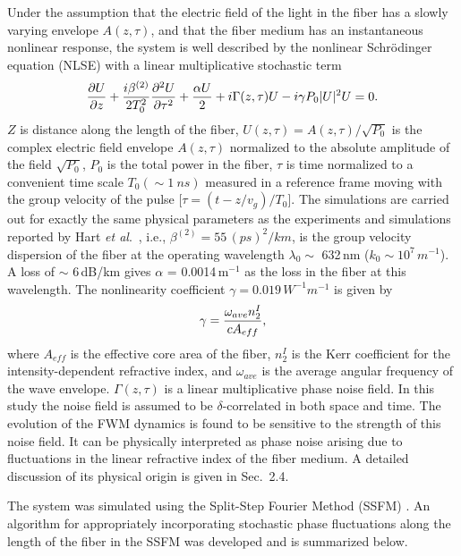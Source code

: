 Under the assumption that the electric field of the light in the fiber has a 
slowly varying envelope $A(z,\tau)$, and that the fiber medium has an 
instantaneous nonlinear response, the system is well described by the 
nonlinear Schr\"{o}dinger equation (NLSE) with a linear multiplicative
stochastic term
\begin{equation}
{\partial U \over \partial z} + {i\beta^{(2)} \over 2T_0^2} 
{\partial^2 U \over \partial\tau^2} + {\alpha U \over 2}
 + i\Gamma(z,\tau)U-i\gamma P_0 |U|^2 U = 0.
\end{equation}
$Z$ is distance along the length of the fiber, 
$U(z,\tau)=A(z,\tau)/\sqrt{P_0}$ is the complex electric field envelope 
$A(z,\tau)$ normalized to the absolute amplitude of the field $\sqrt{P_0}$, 
$P_0$ is the total power in the fiber, $\tau$ is time normalized to a 
convenient time scale $T_0(\sim 1\ ns)$ measured in a reference frame 
moving with the group velocity of the pulse [$\tau=(t-z/v_g)/T_0$]. The 
simulations are carried out for exactly the same physical parameters as the 
experiments and simulations reported by Hart {\it et al}.\ \cite{hart1}, i.e., 
$\beta^{(2)}=55\,(ps)^2/km$, is the group velocity dispersion of the fiber at 
the operating wavelength $\lambda_{0}\sim$ 632\,nm 
($k_0\sim 10^7\,m^{-1}$). A loss of $\sim$ 6\,dB/km gives $\alpha$ = 0.0014\,m$^{-1}$ as the 
loss in the fiber at this wavelength. The nonlinearity coefficient 
$\gamma=0.019\,W^{-1}m^{-1}$ is given by 
\begin{equation}
\gamma = {\omega_{ave}n_2^I \over cA_{eff}},
\end{equation}
where $A_{eff}$ is the effective core area of the fiber,
$n_2^I$ is the Kerr coefficient for the intensity-dependent refractive index, and 
$\omega_{ave}$ is the average angular frequency of the wave envelope. 
$\Gamma(z,\tau)$ is a linear multiplicative phase noise field. In this study 
the noise field is assumed to be $\delta$-correlated in both space and time. 
The evolution of the FWM dynamics is found to be sensitive to the strength of 
this noise field. It can be physically interpreted as phase noise arising due 
to fluctuations in the linear refractive index of the fiber medium. A detailed 
discussion of its physical origin is given in Sec.\ 2.4.

The system was simulated using the Split-Step Fourier Method (SSFM) 
\cite{Agrawal2}. An algorithm for appropriately incorporating stochastic
phase fluctuations along the length of the fiber in the SSFM was developed
and is summarized below.

